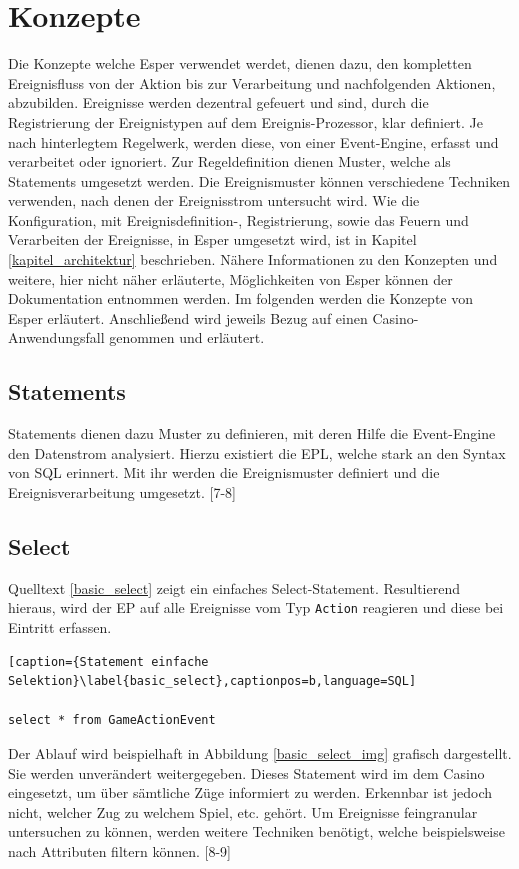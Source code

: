 \chapter{Konzepte}
Die Konzepte welche Esper verwendet werdet, dienen dazu, den kompletten Ereignisfluss von der Aktion bis zur Verarbeitung und nachfolgenden Aktionen, abzubilden.
Ereignisse werden dezentral gefeuert und sind, durch die Registrierung der Ereignistypen auf dem Ereignis-Prozessor, klar definiert. Je nach hinterlegtem Regelwerk, werden diese, von einer Event-Engine, erfasst und verarbeitet oder ignoriert. Zur Regeldefinition dienen Muster, welche als Statements umgesetzt werden. Die Ereignismuster können verschiedene Techniken verwenden, nach denen der Ereignisstrom untersucht wird. 
Wie die Konfiguration, mit Ereignisdefinition-, Registrierung, sowie das Feuern und Verarbeiten der Ereignisse, in Esper umgesetzt wird, ist in Kapitel \ref{kapitel_architektur} beschrieben.
Nähere Informationen zu den Konzepten und weitere, hier nicht näher erläuterte, Möglichkeiten von Esper können der Dokumentation \cite{EsperRef2018} entnommen werden.
Im folgenden werden die Konzepte von Esper erläutert. Anschließend wird jeweils Bezug auf einen Casino-Anwendungsfall genommen und erläutert.


\section{Statements}
\label{statements}
Statements dienen dazu Muster zu definieren, mit deren Hilfe die Event-Engine den Datenstrom analysiert. Hierzu existiert die \acf{EPL}, welche stark an den Syntax von SQL erinnert. Mit ihr werden die Ereignismuster definiert und die Ereignisverarbeitung umgesetzt.
\cite{EsperRef2018}[7-8]

\section{Select}

Quelltext \ref{basic_select} zeigt ein einfaches Select-Statement. Resultierend hieraus, wird der \acf{EP} auf alle Ereignisse vom Typ \texttt{Action} reagieren und diese bei Eintritt erfassen. 
\begin{lstlisting}[caption={Statement einfache Selektion}\label{basic_select},captionpos=b,language=SQL]

select * from GameActionEvent

\end{lstlisting}
Der Ablauf wird beispielhaft in Abbildung \ref{basic_select_img} grafisch dargestellt. Sie werden unverändert weitergegeben. Dieses Statement wird im dem Casino eingesetzt, um über sämtliche Züge informiert zu werden. Erkennbar ist jedoch nicht, welcher Zug zu welchem Spiel, etc. gehört. Um Ereignisse feingranular untersuchen zu können, werden weitere Techniken benötigt, welche beispielsweise nach Attributen filtern können.
\cite{EsperRef2018}[8-9]

